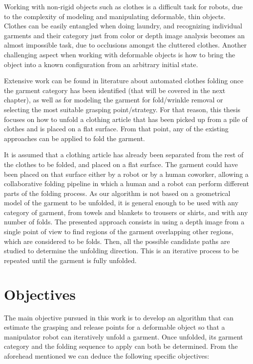 Working with non-rigid objects such as clothes is a difficult task for robots, due to the complexity of modeling and manipulating deformable, thin objects. Clothes can be easily entangled when doing laundry, and recognizing individual garments and their category just from color or depth image analysis becomes an almost impossible task, due to occlusions amongst the cluttered clothes. Another challenging aspect when working with deformable objects is how to bring the object into a known configuration from an arbitrary initial state.


Extensive work can be found in literature about automated clothes folding once the garment category has been identified (that will be covered in the next chapter), as well as for modeling the garment for fold/wrinkle removal or selecting the most suitable grasping point/strategy. For that reason, this thesis focuses on how to unfold a clothing article that has been picked up from a pile of clothes and is placed on a flat surface. From that point, any of the existing approaches can be applied to fold the garment.

It is assumed that a clothing article has already been separated from the rest of the clothes to be folded, and placed on a flat surface. The garment could have been placed on that surface either by a robot or by a human coworker, allowing a collaborative folding pipeline in which a human and a robot can perform different parts of the folding process.
As our algorithm is not based on a geometrical model of the garment to be unfolded, it is general enough to be used with any category of garment, from towels and blankets to trousers or shirts, and with any number of folds. 
%
The presented approach consists in using a depth image from a single point of view to find regions of the garment overlapping other regions, which are considered to be folds. Then, all the possible candidate paths are studied to determine the unfolding direction. This is an iterative process to be repeated until the garment is fully unfolded.

\section{Objectives}
\label{intro_objectives}
The main objective pursued in this work is to develop an algorithm that can estimate the grasping and release points for a deformable object so that a manipulator robot can iteratively unfold a garment. Once unfolded, its garment category  and the folding sequence to apply can both be determined. From the aforehead mentioned  we can deduce the following specific objectives:


